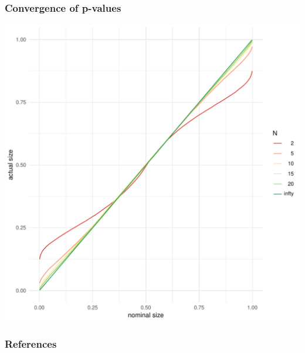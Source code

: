 \begin{frame} \frametitle{Convergence of p-values}

  \includegraphics[height=\figheight,width=\figwidth]{clt-p}

\end{frame}





\begin{frame}[allowframebreaks]
  \frametitle{References}
 

\end{frame}


